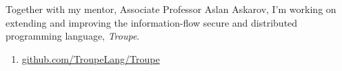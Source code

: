 
Together with my mentor, Associate Professor Aslan Askarov, I'm working on extending and improving
the information-flow secure and distributed programming language, \emph{Troupe}.

\medskip

\begin{enumerate}[leftmargin=2.5em]
\item[\indent\faGit] \href{https://github.com/TroupeLang/Troupe}{github.com/TroupeLang/Troupe}
\end{enumerate}

\medskip